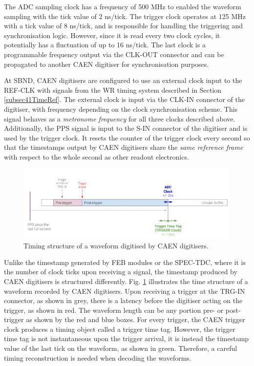 The ADC sampling clock has a frequency of 500 MHz to enabled the waveform sampling with the tick value of 2 ns/tick. 
The trigger clock operates at 125 MHz with a tick value of 8 ns/tick, and is responsible for handling the triggering and synchronisation logic.
However, since it is read every two clock cycles, it potentially has a fluctuation of up to 16 ns/tick.
The last clock is a programmable frequency output via the CLK-OUT connector and can be propagated to another CAEN digitiser for synchronisation purposes.

At SBND, CAEN digitisers are configured to use an external clock input to the REF-CLK with signals from the WR timing system described in Section \ref{subsec41TimeRef}.
The external clock is input via the CLK-IN connector of the digitiser, with frequency depending on the clock synchronisation scheme.
This signal behaves as a \textit{metronome frequency} for all three clocks described above.
Additionally, the PPS signal is input to the S-IN connector of the digitiser and is used by the trigger clock.
It resets the counter of the trigger clock every second so that the timestamps output by CAEN digitisers share the \textit{same reference frame} with respect to the whole second as other readout electronics.

\begin{figure}[b!] 
\centering    
\includegraphics[width=1.0\textwidth]{TTT_diagram}
\caption[Timing Structure of a Waveform Digitised by CAEN]{
Timing structure of a waveform digitised by CAEN digitisers.
}

\label{fig:TTTDiagram}
\end{figure}


Unlike the timestamp generated by FEB modules or the SPEC-TDC, where it is the number of clock ticks upon receiving a signal, the timestamp produced by CAEN digitisers is structured differently.
Fig. \ref{fig:TTTDiagram} illustrates the time structure of a waveform recorded by CAEN digitisers.
Upon receiving a trigger at the TRG-IN connector, as shown in grey, there is a latency before the digitiser acting on the trigger, as shown in red.
The waveform length can be any portion pre- or post-trigger as shown by the red and blue boxes.
For every trigger, the CAEN trigger clock produces a timing object called a trigger time tag.
However, the trigger time tag is not instantaneous upon the trigger arrival, it is instead the timestamp value of the last tick on the waveform, as shown in green.
Therefore, a careful timing reconstruction is needed when decoding the waveforms.

